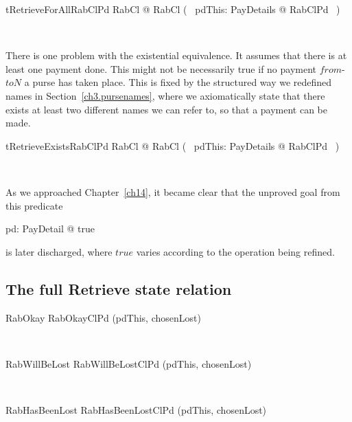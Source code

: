 \begin{LThm}
\begin{theorem}{tRetrieveForAllRabClPd}
   \forall RabCl @ RabCl \iff (~ \forall pdThis: PayDetails @ RabClPd ~)
\end{theorem}~\end{LThm}

There is one problem with the existential equivalence. It assumes that there is
at least one payment done. This might not be necessarily true if no payment $from$-$toN$ a purse has taken place.
This is fixed by the structured way we redefined names in Section~\ref{ch3.pursenames},
where we axiomatically state that there exists at least two different names we can refer to,
so that a payment can be made.
%
\begin{LThm}
\begin{theorem}{tRetrieveExistsRabClPd}
   \forall RabCl @ RabCl \iff (~ \exists pdThis: PayDetails @ RabClPd ~)
\end{theorem}~\end{LThm}
%
As we approached Chapter~\ref{ch14}, it became clear that the unproved
goal from this predicate
%
\begin{gzed}
    \exists pd: PayDetail @ true
\end{gzed}
%
is later discharged, where $true$ varies according to the operation being refined.

\subsection{The full Retrieve state relation}

\begin{LSDef}
\begin{zed}
  RabOkay  RabOkayClPd \hide (pdThis, chosenLost)
\end{zed}~\end{LSDef}

\begin{LSDef}
\begin{zed}
  RabWillBeLost  RabWillBeLostClPd \hide (pdThis, chosenLost)
\end{zed}~\end{LSDef}

\begin{LSDef}
\begin{zed}
  RabHasBeenLost  RabHasBeenLostClPd \hide (pdThis, chosenLost)
\end{zed}~\end{LSDef}

